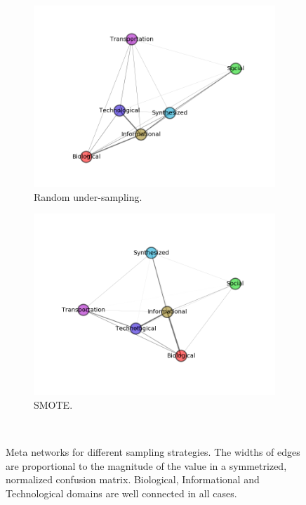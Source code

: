 \documentclass{article}
\begin{document}
\begin{figure}[H]
\medskip
\begin{subfigure}{0.48\textwidth}
\includegraphics[width=\linewidth]{figs/similarity/Domain/RandomUnder_26/g.png}
\caption{Random under-sampling.} \label{random_under_graph}
\end{subfigure}\hspace*{\fill}
\begin{subfigure}{0.48\textwidth}
\includegraphics[width=\linewidth]{figs/similarity/Domain/SMOTE/g.png}
\caption{SMOTE.} \label{smote_graph}
\end{subfigure}
\
\caption{Meta networks for different sampling strategies. The widths of edges are proportional to the magnitude of the value in a symmetrized, normalized confusion matrix. Biological, Informational and Technological domains are well connected in all cases.} \label{meta_network}
\end{figure}
\end{document}
